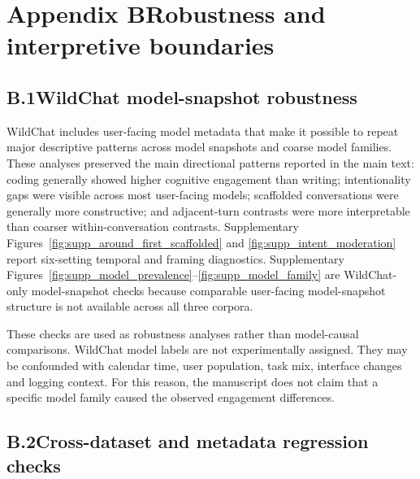 \section*{Appendix B\quad Robustness and interpretive boundaries}

\subsection*{B.1\quad WildChat model-snapshot robustness}

WildChat includes user-facing model metadata that make it possible to repeat major descriptive patterns across model snapshots and coarse model families. These analyses preserved the main directional patterns reported in the main text: coding generally showed higher cognitive engagement than writing; intentionality gaps were visible across most user-facing models; scaffolded conversations were generally more constructive; and adjacent-turn contrasts were more interpretable than coarser within-conversation contrasts. Supplementary Figures~\ref{fig:supp_around_first_scaffolded} and \ref{fig:supp_intent_moderation} report six-setting temporal and framing diagnostics. Supplementary Figures~\ref{fig:supp_model_prevalence}--\ref{fig:supp_model_family} are WildChat-only model-snapshot checks because comparable user-facing model-snapshot structure is not available across all three corpora.

These checks are used as robustness analyses rather than model-causal comparisons. WildChat model labels are not experimentally assigned. They may be confounded with calendar time, user population, task mix, interface changes and logging context. For this reason, the manuscript does not claim that a specific model family caused the observed engagement differences.

\subsection*{B.2\quad Cross-dataset and metadata regression checks}

